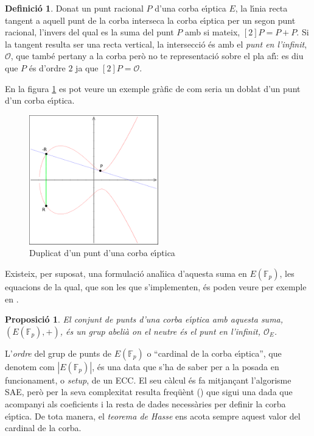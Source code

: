 \documentclass[12pt,twoside,catalan,a4paper]{book}%
\newtheorem{prop}[thm]{Proposici\'o}
\numberwithin{figure}{section}		%
\theoremstyle{definition}   			%
\newtheorem{defi}{Definici\'o}[chapter]%
\def\ce{corba e\lgem{}\'{\i}ptica}%
\newcommand{\Fp}{\ensuremath{\mathbb{F}_p}}%
\newcommand{\PaI}{\ensuremath{\mathcal{O}}}%
\theoremstyle{saltolinea}   			%
\begin{document}
\begin{defi}\label{def:duplEracional} Donat un punt racional $P$ d'una \ce{} $E$, la l\'{\i}nia recta tangent a aquell punt de la corba interseca la \ce{} per un segon punt racional, l'invers del qual es la suma del punt $P$ amb si mateix, $[2]P=P+P$. Si la tangent resulta ser una recta vertical, la intersecci\'o \'es amb el \emph{punt en l'infinit}, \PaI, que tamb\'e pertany a la corba per\`o no te representaci\'o sobre el pla af\'{\i}: es diu que $P$ \'es d'ordre $2$ ja que $[2]P=\mathcal{O}$.
\end{defi}
En la figura \ref{fig:duplEracional} es pot veure un exemple gr\`afic de com seria un doblat d'un punt d'un \ce.

\begin{figure}[ht]
\centering
\includegraphics[width=0.5\textwidth]{plots/curve2_mod.png}
\caption{Duplicat d'un punt d'una \ce \label{fig:duplEracional}}
\end{figure}

Existeix, per suposat, una formulaci\'o anal\'{\i}ica d'aquesta suma en $E(\Fp)$, les equacions de la qual, que son les que s'implementen, \'es poden veure per exemple en \cite{HANDECC,LMS265}.
\begin{prop}\label{prop:grpunts} El conjunt de punts d'una \ce{} amb aquesta suma, $\left(E(\Fp),+\right)$, \'es un grup abeli\`a on el neutre \'es el punt en l'infinit, $\mathcal{O}_E$.\end{prop}

L'\emph{ordre} del  grup de punts de $E(\Fp)$ o ``cardinal de la \ce{}'', que denotem com $\left|E(\Fp)\right|$, \'es una data que s'ha de saber per a la posada en funcionament, o \emph{setup}, de un ECC. El seu c\`alcul \'es fa mitjan\c{c}ant l'algorisme SAE, per\`o per la seva complexitat resulta freq\"u\`ent (\cite{NIST186}) que sigui una dada que acompanyi als coeficients i la resta de dades necess\`aries per definir la \ce{}. De tota manera, el \emph{teorema de Hasse} ens acota sempre aquest valor del cardinal de la corba.
\end{document}
